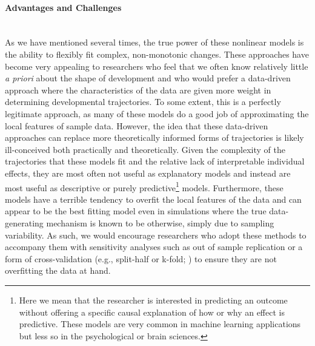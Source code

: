 \documentclass[11pt]{article}
\newcommand{\subsubsubsection}[1]{\paragraph{#1}\mbox{}\\}  %
\begin{document}
\subsubsubsection{Advantages and Challenges}
As we have mentioned several times, the true power of these nonlinear models is the ability to flexibly fit complex, non-monotonic changes. These approaches have become very appealing to researchers who feel that we often know relatively little \textit{a priori} about the shape of development and who would prefer a data-driven approach where the characteristics of the data are given more weight in determining developmental trajectories. To some extent, this is a perfectly legitimate approach, as many of these models do a good job of approximating the local features of sample data. However, the idea that these data-driven approaches can replace more theoretically informed forms of trajectories is likely ill-conceived both practically and theoretically. Given the complexity of the trajectories that these models fit and the relative lack of interpretable individual effects, they are most often not useful as explanatory models and instead are most useful as descriptive or purely predictive\footnote{Here we mean that the researcher is interested in predicting an outcome without offering a specific causal explanation of how or why an effect is predictive. These models are very common in machine learning applications but less so in the psychological or brain sciences.} models. Furthermore, these models have a terrible tendency to overfit the local features of the data and can appear to be the best fitting model even in simulations where the true data-generating mechanism is known to be otherwise, simply due to sampling variability. As such, we would encourage researchers who adopt these methods to accompany them with sensitivity analyses such as out of sample replication or a form of cross-validation (e.g., split-half or k-fold; \cite{grimm_model_2017,jacobucci_evidence_2021,de_rooij_cross-validation_2020}) to ensure they are not overfitting the data at hand.
\end{document}
